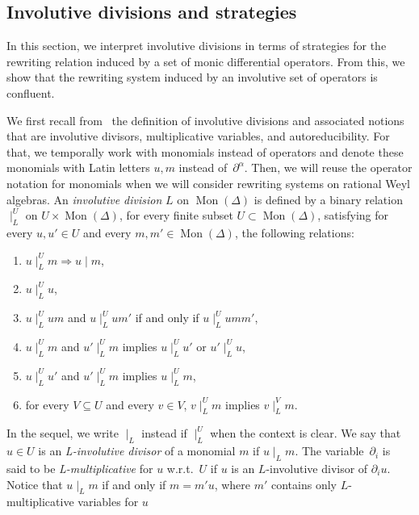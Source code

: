 \documentclass[10pt]{easychair}
\theoremstyle{definition}
\DeclareMathOperator{\Mon}{Mon}
\newcommand\divInv[1]{\mid_{#1}}
\begin{document}
\subsection{Involutive divisions and strategies}
\label{sec:involutive_divisions_ and_strategies}

In this section, we interpret involutive divisions in terms of strategies
for the rewriting relation induced by a set of monic differential
operators. From this, we show that the rewriting system induced by an
involutive set of operators is confluent.
\medskip

We first recall from~\cite{MR1627129} the definition of involutive
divisions and associated notions that are involutive divisors,
multiplicative variables, and autoreducibility. For that, we temporally
work with monomials instead of operators and denote these monomials with
Latin letters $u,m$ instead of~$\partial^\alpha$. Then, we will reuse the
operator notation for monomials when we will consider rewriting systems
on rational Weyl algebras. An {\em involutive division} $L$ on
$\Mon(\Delta)$ is defined by a binary relation $\divInv{L}^U$ on
$U\times\Mon(\Delta)$, for every finite subset $U\subset\Mon(\Delta)$,
satisfying for every $u,u'\in U$ and every $m,m'\in\Mon(\Delta)$, the
following relations:
\begin{enumerate}[label=\alph*)]
\item\label{it:div} $u\divInv{L}^Um\Rightarrow u\mid m$,
\item\label{it:unit} $u\divInv{L}^Uu$,
\item\label{it:mul} $u\divInv{L}^Uum$ and $u\divInv{L}^Uum'$ if and only
  if $u\divInv{L}^Uumm'$,
\item\label{it:vertex} $u\divInv{L}^Um$ and $u'\divInv{L}^Um$ implies
  $u\divInv{L}^Uu'$ or $u'\divInv{L}^Uu$,
\item\label{it:transitivity} $u\divInv{L}^Uu'$ and $u'\divInv{L}^Um$
  implies $u\divInv{L}^Um$,
\item\label{it:filter} for every $V\subseteq U$ and every $v\in V$,
  $v\divInv{L}^Um$ implies $v\divInv{L}^Vm$. 
\end{enumerate}
In the sequel, we write $\divInv{L}$ instead if $\divInv{L}^U$ when the
context is clear. We say that $u\in U$ is an {\em L-involutive divisor}
of a monomial $m$ if $u\divInv{L}m$. The variable~$\partial_i$ is said to be
{\em L-multiplicative} for $u$ w.r.t.\ $U$ if $u$ is an $L$-involutive
divisor of $\partial_iu$. Notice that $u\divInv{L}m$ if and only if
$m=m'u$, where $m'$ contains only $L$-multiplicative variables for $u$
\end{document}
